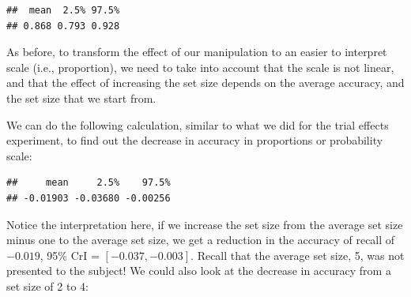 \documentclass[12pt,]{krantz}
\newenvironment{Shaded}{\begin{snugshade}}{\end{snugshade}}
\newcommand{\KeywordTok}[1]{\textcolor[rgb]{0.13,0.29,0.53}{\textbf{#1}}}
\newcommand{\DataTypeTok}[1]{\textcolor[rgb]{0.13,0.29,0.53}{#1}}
\newcommand{\DecValTok}[1]{\textcolor[rgb]{0.00,0.00,0.81}{#1}}
\newcommand{\StringTok}[1]{\textcolor[rgb]{0.31,0.60,0.02}{#1}}
\newcommand{\OperatorTok}[1]{\textcolor[rgb]{0.81,0.36,0.00}{\textbf{#1}}}
\newcommand{\NormalTok}[1]{#1}
\theoremstyle{definition}
\theoremstyle{definition}
\theoremstyle{definition}
\theoremstyle{remark}
\begin{document}
\begin{verbatim}
##  mean  2.5% 97.5% 
## 0.868 0.793 0.928
\end{verbatim}

As before, to transform the effect of our manipulation to an easier to
interpret scale (i.e., proportion), we need to take into account that
the scale is not linear, and that the effect of increasing the set size
depends on the average accuracy, and the set size that we start from.

We can do the following calculation, similar to what we did for the
trial effects experiment, to find out the decrease in accuracy in
proportions or probability scale:

\begin{Shaded}
\end{Shaded}

\begin{verbatim}
##     mean     2.5%    97.5% 
## -0.01903 -0.03680 -0.00256
\end{verbatim}

Notice the interpretation here, if we increase the set size from the
average set size minus one to the average set size, we get a reduction
in the accuracy of recall of \(-0.019\), 95\% CrI =
\([ -0.037 , -0.003 ]\). Recall that the average set size, 5, was not
presented to the subject! We could also look at the decrease in accuracy
from a set size of 2 to 4:

\begin{Shaded}
\end{Shaded}
\end{document}

